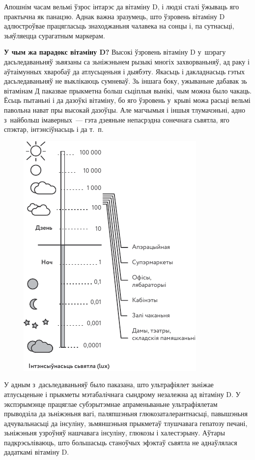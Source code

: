 Апошнім часам вельмі ўзрос інтарэс да вітаміну D, і людзі сталі ўжываць яго практычна як панацэю. Аднак важна зразумець, што ўзровень вітаміну D адлюстроўвае працягласьць знаходжаньня чалавека на сонцы і, па сутнасьці, зьяўляецца сурагатным маркерам.

\textbf{У чым жа парадокс вітаміну D?} Высокі ўзровень вітаміну D у~шэрагу дасьледаваньняў зьвязаны са зьніжэньнем рызыкі многіх захворваньняў, ад раку і аўтаімунных хваробаў да атлусьценьня і дыябэту. Якасьць і дакладнасьць гэтых дасьледаваньняў не выклікаюць сумневаў. Зь іншага боку, ужываньне дабавак зь вітамінам Д паказвае прыкметна больш сьціплыя вынікі, чым можна было чакаць. Ёсьць пытаньні і да дазоўкі вітаміну, бо яго ўзровень у~крыві можа расьці вельмі павольна нават пры высокай дазоўцы. Але магчымыя і іншыя тлумачэньні, адно з~найбольш імаверных~--- гэта дзеяньне непасрэдна сонечнага сьвятла, яго спэктар, інтэнсіўнасьць і да т.~п. 


\begin{figure}[htb!]
  \centering
  \includegraphics[scale=1.3]{willpower/ch12/1.pdf}
\end{figure}

У адным з~дасьледаваньняў было паказана, што ультрафіялет зьніжае атлусьценьне і прыкметы мэтабалічнага сындрому незалежна ад вітаміну D. У экспэрымэнце працяглае субэрытэмнае апраменьваньне ультрафіялетам прыводзіла да зьніжэньня вагі, паляпшэньня глюкозаталерантнасьці, павышэньня адчувальнасьці да інсуліну, зьмяншэньня прыкметаў тлушчавага гепатозу печані, зьніжэньня узроўняў нашчавага інсуліну, глюкозы і халестэрыну. Аўтары падкрэсьліваюць, што большасьць станоўчых эфэктаў сьвятла не аднаўлялася дадаткамі вітаміну D.

